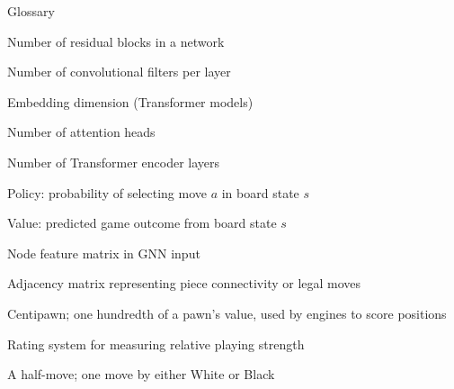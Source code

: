 
\begin{dictionary}{Glossary}
\item[$N$] Number of residual blocks in a network
\item[$F$] Number of convolutional filters per layer
\item[$d$] Embedding dimension (Transformer models)
\item[$h$] Number of attention heads
\item[$L$] Number of Transformer encoder layers
\item[$\pi(a \mid s)$] Policy: probability of selecting move $a$ in board state $s$
\item[$v(s)$] Value: predicted game outcome from board state $s$
\item[$\mathbf{X}$] Node feature matrix in GNN input
\item[$\mathbf{A}$] Adjacency matrix representing piece connectivity or legal moves
\item[cp] Centipawn; one hundredth of a pawn's value, used by engines to score positions
\item[ELO] Rating system for measuring relative playing strength
\item[ply] A half-move; one move by either White or Black
\end{dictionary}
